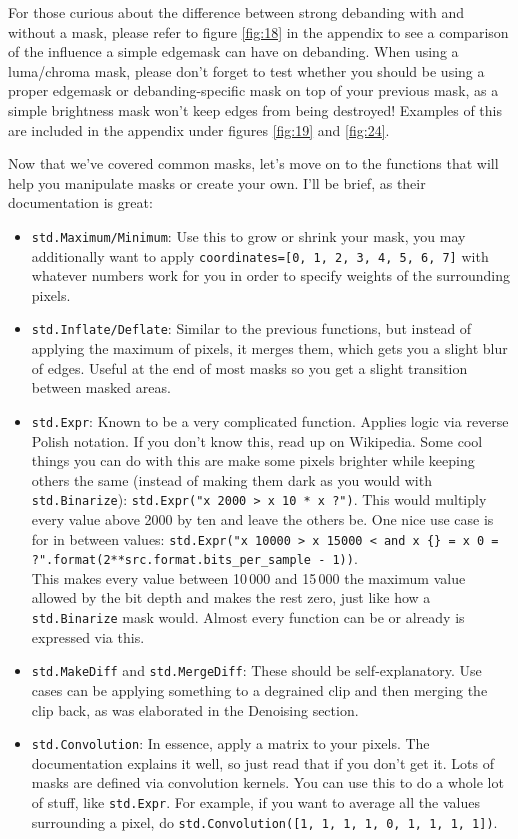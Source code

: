 \documentclass{scrartcl}
\begin{document}
For those curious about the difference between strong debanding with and without a mask, please refer to figure \ref{fig:18} in the appendix to see a comparison of the influence a simple edgemask can have on debanding.  When using a luma/chroma mask, please don't forget to test whether you should be using a proper edgemask or debanding-specific mask on top of your previous mask, as a simple brightness mask won't keep edges from being destroyed!  Examples of this are included in the appendix under figures \ref{fig:19} and \ref{fig:24}.

Now that we've covered common masks, let's move on to the functions that will help you manipulate masks or create your own. I'll be brief, as their documentation is great:
\begin{itemize}
\item \texttt{std.Maximum/Minimum}: Use this to grow or shrink your mask, you may additionally want to apply \texttt{coordinates=[0, 1, 2, 3, 4, 5, 6, 7]} with whatever numbers work for you in order to specify weights of the surrounding pixels.
\item \texttt{std.Inflate/Deflate}: Similar to the previous functions, but instead of applying the maximum of pixels, it merges them, which gets you a slight blur of edges.  Useful at the end of most masks so you get a slight transition between masked areas.
\item \texttt{std.Expr}: Known to be a very complicated function.  Applies logic via reverse Polish notation.  If you don't know this, read up on Wikipedia.  Some cool things you can do with this are make some pixels brighter while keeping others the same (instead of making them dark as you would with \texttt{std.Binarize}): \texttt{std.Expr("x 2000 > x 10 * x ?")}.  This would multiply every value above 2000 by ten and leave the others be.  One nice use case is for in between values: \texttt{std.Expr("x 10000 > x 15000 < and x \{\} = x 0 = ?".format(2**src.format.bits\_per\_sample - 1))}.  \\This makes every value between 10\,000 and 15\,000 the maximum value allowed by the bit depth and makes the rest zero, just like how a \texttt{std.Binarize} mask would.  Almost every function can be or already is expressed via this.
\item \texttt{std.MakeDiff} and \texttt{std.MergeDiff}: These should be self-explanatory.  Use cases can be applying something to a degrained clip and then merging the clip back, as was elaborated in the Denoising section.
\item \texttt{std.Convolution}: In essence, apply a matrix to your pixels.  The documentation explains it well, so just read that if you don't get it.  Lots of masks are defined via convolution kernels.  You can use this to do a whole lot of stuff, like \texttt{std.Expr}.  For example, if you want to average all the values surrounding a pixel, do \texttt{std.Convolution([1, 1, 1, 1, 0, 1, 1, 1, 1])}.

\end{itemize}
\end{document}
